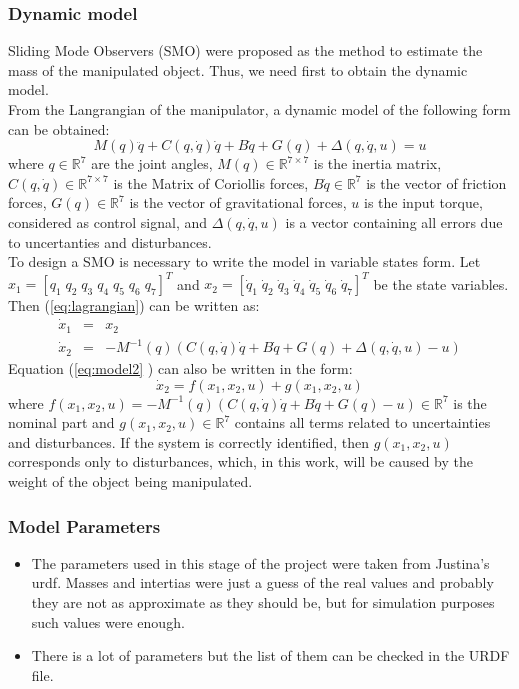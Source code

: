 \documentclass[9pt,spanish,aspectratio=1610]{beamer}
\begin{document}
\begin{frame}\frametitle{Dynamic model}
  Sliding Mode Observers (SMO) were proposed as the method to estimate the mass of the manipulated object. Thus, we need first to obtain the dynamic model.\\
  From the Langrangian of the manipulator, a dynamic model of the following form can be obtained:
  \begin{equation}
    M(q)\ddot{q} + C(q, \dot{q})\dot{q} + B\dot{q} + G(q) + \Delta(q,\dot{q}, u) = u
    \label{eq:lagrangian}
  \end{equation}
  where $q\in \mathbb{R}^7$ are the joint angles, $M(q)\in \mathbb{R}^{7\times 7}$ is the inertia matrix, $C(q,\dot{q})\in \mathbb{R}^{7\times 7}$ is the Matrix of Coriollis forces, $B\dot{q}\in \mathbb{R}^7$ is the vector of friction forces, $G(q)\in\mathbb{R}^7$ is the vector of gravitational forces, $u$ is the input torque, considered as control signal, and $\Delta(q,\dot{q},u)$ is a vector containing all errors due to uncertanties and disturbances. \\
  To design a SMO is necessary to write the model in variable states form. Let $x_1 = [q_1\;q_2\;q_3\;q_4\;q_5\;q_6\;q_7]^T$ and $x_2 = [\dot{q}_1\;\dot{q}_2\;\dot{q}_3\;\dot{q}_4\;\dot{q}_5\;\dot{q}_6\;\dot{q}_7]^T$ be the state variables. Then (\ref{eq:lagrangian}) can be written as:
  \begin{eqnarray}
    \dot{x}_1 &=& x_2\label{eq:model1}\\
    \dot{x}_2 &=& -M^{-1}(q)\left(C(q, \dot{q})\dot{q} + B\dot{q} + G(q) + \Delta(q,\dot{q},u) - u\right)\label{eq:model2}
  \end{eqnarray}
Equation (\ref{eq:model2} ) can also be written in the form:
  \begin{equation*}
    \dot{x}_2 = f(x_1, x_2, u) + g(x_1, x_2, u)
  \end{equation*}
  where $f(x_1, x_2, u) = -M^{-1}(q)\left(C(q, \dot{q})\dot{q} + B\dot{q} + G(q) - u\right) \in \mathbb{R}^7$ is the nominal part and $g(x_1, x_2, u) \in \mathbb{R}^7$ contains all terms related to uncertainties and disturbances. If the system is correctly identified, then $g(x_1, x_2, u)$ corresponds only to disturbances, which, in this work, will be caused by the weight of the object being manipulated. 
\end{frame}

\begin{frame}\frametitle{Model Parameters}
  \begin{itemize}
  \item The parameters used in this stage of the project were taken from Justina's urdf. Masses and intertias were just a guess of the real values and probably they are not as approximate as they should be, but for simulation purposes such values were enough.
  \item There is a lot of parameters but the list of them can be checked in the URDF file.
  \end{itemize}
\end{frame}
\end{document}
